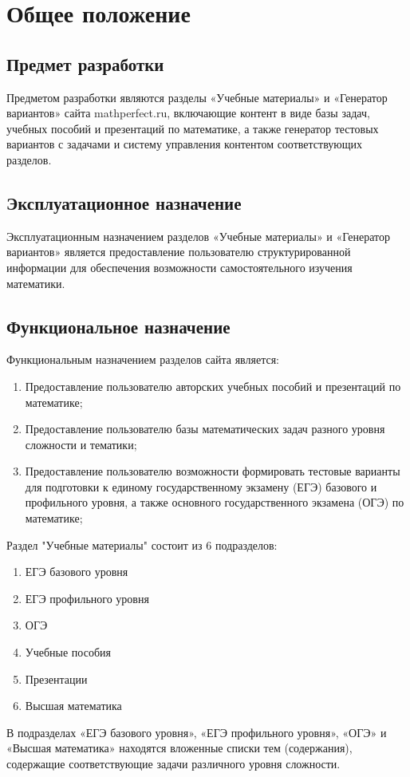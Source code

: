 \section{Общее положение}
\subsection{Предмет разработки}
  Предметом разработки являются разделы «Учебные материалы» и «Генератор вариантов» сайта mathperfect.ru, включающие контент в виде базы задач, учебных пособий и презентаций по математике, а также генератор тестовых вариантов с задачами и систему управления контентом соответствующих разделов.

\subsection{Эксплуатационное назначение}
  Эксплуатационным назначением разделов «Учебные материалы» и «Генератор вариантов» является предоставление пользователю структурированной информации для обеспечения возможности самостоятельного изучения математики.

\subsection{Функциональное назначение}
  Функциональным назначением разделов сайта является:
\begin{enumerate}
  \item Предоставление пользователю авторских учебных пособий и презентаций по математике;
  \item Предоставление пользователю базы математических задач разного уровня сложности и тематики;
  \item Предоставление пользователю возможности формировать тестовые варианты для подготовки к единому государственному экзамену (ЕГЭ) базового и профильного уровня, а также основного государственного экзамена (ОГЭ) по математике;
\end{enumerate}

Раздел "Учебные материалы" состоит из 6 подразделов:
\begin{enumerate}
  \item ЕГЭ базового уровня
  \item ЕГЭ профильного уровня
  \item ОГЭ
  \item Учебные пособия
  \item Презентации
  \item Высшая математика
\end{enumerate}
В подразделах «ЕГЭ базового уровня», «ЕГЭ профильного уровня», «ОГЭ» и «Высшая математика» находятся вложенные списки тем (содержания), содержащие соответствующие задачи различного уровня сложности.

